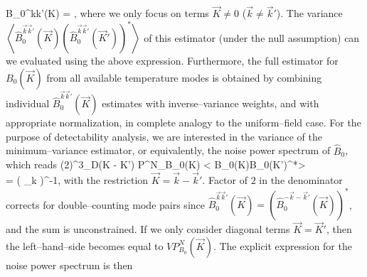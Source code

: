\beq
\widehat B_0^{\vec k\vec k'}(\vec K) = ,
\label{eq:Bkkp_estimator}
\eeq
where we only focus on terms $\vec K\ne0$ ($\vec k \ne\vec k'$).
The variance $\left< \widehat B_0^{\vec k\vec k'}(\vec K)\left(\widehat B_0^{\vec k\vec k'}(\vec K')\right)^*\right>$ of this estimator (under the null assumption) can we evaluated using the above expression.
Furthermore, the full estimator for $B_0(\vec K)$ from all available temperature modes is obtained by combining individual $\widehat B_0^{\vec k\vec k'}(\vec K)$ estimates with inverse--variance weights, and with appropriate normalization, in complete analogy to the uniform--field case. For the purpose of detectability analysis, we are interested in the variance of the minimum--variance estimator, or equivalently, the noise power spectrum of $\widehat B_0$, which reads
\beq
\bga
(2\pi)^3\delta_D(\vec K - \vec K') P^N_{B_0}(\vec K) \equiv \left< \widehat B_0(\vec K)\widehat B_0(\vec K')^*\right>\\
= \left( \sum_{\vec k}  \right)^{-1},
\ega
\label{eq:NK1}
\eeq
with the restriction $\vec K=\vec k-\vec k'$. Factor of $2$ in the denominator corrects for double--counting mode pairs since $\widehat B_0^{\vec k\vec k'}(\vec K)=\left(\widehat B_0^{-\vec k-\vec k'}(\vec K)\right)^*$, and the sum is unconstrained. If we only consider diagonal terms $\vec K=\vec K'$, then the left--hand--side becomes equal to $V P^N_{B_0}(\vec K)$. The explicit expression for the noise power spectrum is then
